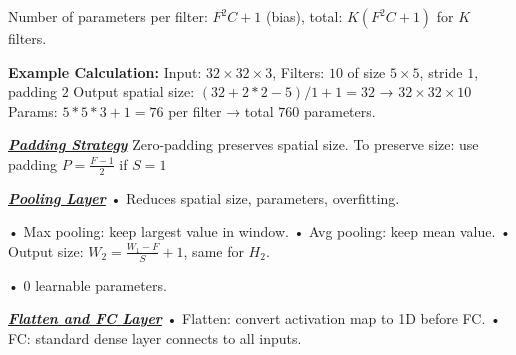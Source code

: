 \documentclass[10pt]{article}
\newcommand{\bulletPoint}[1]{\ul{\textit{\textbf{#1}}}}
\begin{document}
\begin{multicols*}{3}
Number of parameters per filter: $F^2 C + 1$ (bias), \quad total: $K(F^2C + 1)$ for $K$ filters.\quad

\textbf{Example Calculation:} 
Input: $32 \times 32 \times 3$, Filters: $10$ of size $5 \times 5$, stride $1$, padding $2$ \quad
Output spatial size: $(32+2*2-5)/1 + 1 = 32$ → $32 \times 32 \times 10$ \quad
Params: $5*5*3 + 1 = 76$ per filter → total $760$ parameters.

\bulletPoint{Padding Strategy} \quad
Zero-padding preserves spatial size. To preserve size: use padding $P = \frac{F - 1}{2}$ if $S = 1$

\bulletPoint{Pooling Layer} \quad
• Reduces spatial size, parameters, overfitting. \quad

• Max pooling: keep largest value in window. \quad
• Avg pooling: keep mean value. \quad
• Output size: $W_2 = \frac{W_1 - F}{S} + 1$, same for $H_2$. \quad 

• 0 learnable parameters.

\bulletPoint{Flatten and FC Layer} \quad
• Flatten: convert activation map to 1D before FC. \quad
• FC: standard dense layer connects to all inputs.


\lstset{
  basicstyle=\tiny\ttfamily,
  frame=single,                     
  breaklines=true,                  
  columns=flexible,
  keepspaces=true,
  showstringspaces=false,           
  language=Python,            
  aboveskip=1pt,
  belowskip=1pt,
  lineskip=0pt,
  xleftmargin=1em,
  framexleftmargin=1em,
}



\end{multicols*}
\end{document}
